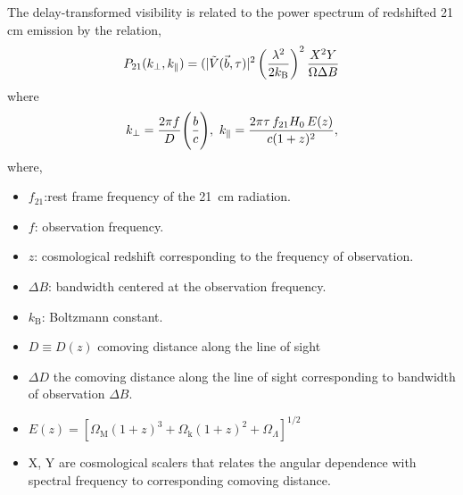 \documentclass[twocolumn]{emulateapj}
\begin{document}
   The delay-transformed visibility is related to the power spectrum of redshifted
    21 cm emission by the relation, 
    \begin{equation}
 P_{21}(k_\perp,k_\parallel) = (|\tilde V(\vec b, \tau)|^{2} \left(\frac{\lambda^2}{2k_\textrm{B}}\right)^2 {X^{2}Y \over \Omega \Delta B}
    \label{eq4}
    \end{equation}
    where
    \begin{equation}
      k_\perp = \frac{2\pi f}{D}\Bigg({b\over c}\Bigg), \text{ }
      k_\parallel = \frac{2\pi\tau\,f_{21}H_0\,E(z)}{c(1+z)^2}, 
     \label{eq5}
    \end{equation}
    where, \\
    \begin{itemize}
    \item
     $f_{21}$:rest frame frequency of the 21~cm radiation.\\
     \item
    $f$: observation frequency.\\
    \item
    $z$: cosmological redshift corresponding to the frequency of observation.\\
    \item
     $\Delta B$: bandwidth centered at the observation frequency.\\
     \item
     $k_\textrm{B}$: Boltzmann constant.\\
     \item
     $D\equiv D(z)$ comoving distance along the line of sight\\
     \item
     $\Delta D$ the comoving distance along the line of sight corresponding to bandwidth of observation $\Delta B$.\\
     \item
    $E(z)= [\Omega_\textrm{M}(1+z)^3+\Omega_\textrm{k}(1+z)^2+\Omega_\Lambda]^{1/2}$ \\
    \item
    X, Y are cosmological scalers that relates the angular dependence with spectral frequency to corresponding comoving distance.
    \end{itemize}
\end{document}
